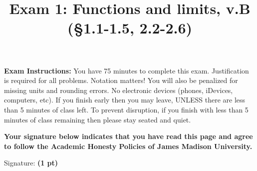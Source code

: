 \documentclass[12pt, addpoints]{exam/exam}
\title{\vspace{-8pc}
\vfill{\Huge
	\bf Exam 1: Functions and limits, v.B \\ (\S1.1-1.5, 2.2-2.6)} 
	}
\date{}
\newcommand{\1}{^{-1}}
\theoremstyle{plain}
\begin{document}
\begin{coverpages}
\maketitle
\thispagestyle{headandfoot}
\vspace{-4pc}
{\bf Exam Instructions:} You have 75 minutes to complete this exam.  Justification is required for all problems.  Notation matters!  You will also be penalized for missing units and rounding errors.  
No electronic devices (phones, iDevices, computers, etc).  %
If you finish early then you may leave, UNLESS there are less than 5 minutes of class left.  To prevent disruption, if you finish with less than 5 minutes of class remaining then please stay seated and quiet.

\begin{flushright}

\vspace{0.3in}

\vspace{0.3in}
\end{flushright}

\vfill
\textbf{Your signature below indicates that you have read this page and agree to follow the Academic Honesty Policies of James Madison University.}  

\vspace{0.3in}
Signature: {\bf (1 pt)} \underline{\hspace{73ex}}

\newpage
\vspace*{\fill}
\gradetable
\end{coverpages}
\end{document}
